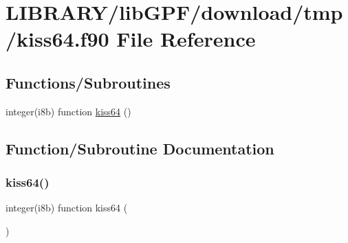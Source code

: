 \hypertarget{kiss64_8f90}{}\section{L\+I\+B\+R\+A\+R\+Y/lib\+G\+P\+F/download/tmp/kiss64.f90 File Reference}
\label{kiss64_8f90}
\subsection*{Functions/\+Subroutines}
\begin{DoxyCompactItemize}
\item 
integer(i8b) function \hyperlink{kiss64_8f90_a0623f0b2acd0f562b14b953dd0f85ff7}{kiss64} ()
\end{DoxyCompactItemize}


\subsection{Function/\+Subroutine Documentation}
\mbox{\label{kiss64_8f90_a0623f0b2acd0f562b14b953dd0f85ff7}} 
\subsubsection{\texorpdfstring{kiss64()}{kiss64()}}
{\footnotesize\ttfamily integer(i8b) function kiss64 (\begin{DoxyParamCaption}{ }\end{DoxyParamCaption})}

